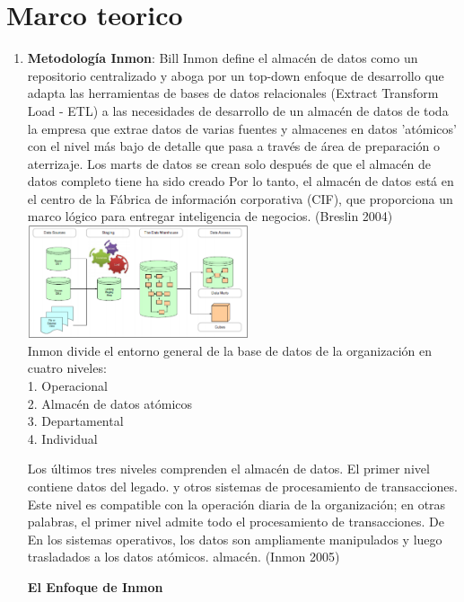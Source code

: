 \documentclass[twoside,twocolumn]{article}
\begin{document}
\section{Marco teorico}
\begin{enumerate}
\item \textbf{Metodología Inmon}:
Bill Inmon define el almacén de datos como un repositorio centralizado y aboga por un top-down
enfoque de desarrollo que adapta las herramientas de bases de datos relacionales (Extract Transform Load - ETL)
a las necesidades de desarrollo de un almacén de datos de toda la empresa que extrae datos de
varias fuentes y almacenes en datos 'atómicos' con el nivel más bajo de detalle que pasa a través de
área de preparación o aterrizaje. Los marts de datos se crean solo después de que el almacén de datos completo tiene
ha sido creado Por lo tanto, el almacén de datos está en el centro de la Fábrica de información corporativa (CIF),
que proporciona un marco lógico para entregar inteligencia de negocios. (Breslin 2004)\\
\includegraphics[width=6.5cm]{Imagenes/inmom1}
\\

Inmon divide el entorno general de la base de datos de la organización en cuatro niveles:
\\
1. Operacional
\\
2. Almacén de datos atómicos
\\
3. Departamental
\\
4. Individual

Los últimos tres niveles comprenden el almacén de datos. El primer nivel contiene datos del legado.
y otros sistemas de procesamiento de transacciones. Este nivel es compatible con la operación diaria de
la organización; en otras palabras, el primer nivel admite todo el procesamiento de transacciones. De
En los sistemas operativos, los datos son ampliamente manipulados y luego trasladados a los datos atómicos.
almacén. (Inmon 2005)

\textbf{}
\textbf{El Enfoque de Inmon}\\


\end{enumerate}
\end{document}
